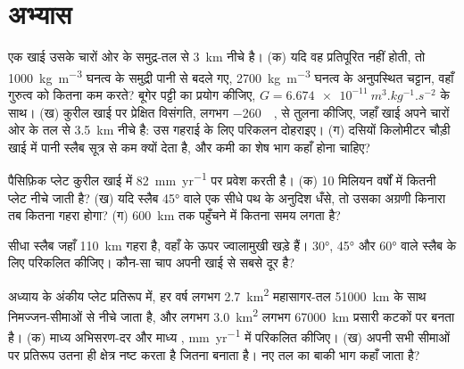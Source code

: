 \section{अभ्यास}

\begin{exercise}[$\star$]\label{exo:b1:active-margins:1}
एक खाई उसके चारों ओर के समुद्र-तल से \qty{3}{km} नीचे है। (क) यदि वह प्रतिपूरित नहीं होती, तो \qty{1000}{kg.m^{-3}} घनत्व के समुद्री पानी से बदले गए, \qty{2700}{kg.m^{-3}} घनत्व के अनुपस्थित चट्टान, वहाँ गुरुत्व को कितना कम करते? बूगेर पट्टी का प्रयोग कीजिए, $G = \qty{6.674e-11}{m^3.kg^{-1}.s^{-2}}$ के साथ। (ख) कुरील खाई पर प्रेक्षित विसंगति, लगभग \qty{-260}{\milli\gal}, से तुलना कीजिए, जहाँ खाई अपने चारों ओर के तल से \qty{3.5}{km} नीचे है: उस गहराई के लिए परिकलन दोहराइए। (ग) दसियों किलोमीटर चौड़ी खाई में पानी स्लैब सूत्र से कम क्यों देता है, और कमी का शेष भाग कहाँ होना चाहिए?
\end{exercise}

\begin{exercise}[$\star$]\label{exo:b1:active-margins:2}
पैसिफ़िक प्लेट कुरील खाई में \qty{82}{mm.yr^{-1}} पर प्रवेश करती है। (क) 10 मिलियन वर्षों में कितनी प्लेट नीचे जाती है? (ख) यदि स्लैब \ang{45}  वाले एक सीधे पथ के अनुदिश धँसे, तो उसका अग्रणी किनारा तब कितना गहरा होगा? (ग) \qty{600}{km} तक पहुँचने में कितना समय लगता है?
\end{exercise}

\begin{exercise}[$\star$]\label{exo:b1:active-margins:3}
सीधा स्लैब जहाँ \qty{110}{km} गहरा है, वहाँ के ऊपर ज्वालामुखी खड़े हैं। \ang{30}, \ang{45} और \ang{60}  वाले स्लैब के लिए  परिकलित कीजिए। कौन-सा चाप अपनी खाई से सबसे दूर है?
\end{exercise}

\begin{exercise}[$\star$]\label{exo:b1:active-margins:4}
अध्याय के अंकीय प्लेट प्रतिरूप में, हर वर्ष लगभग \qty{2.7}{km^2} महासागर-तल \qty{51000}{km} के साथ निमज्जन-सीमाओं से नीचे जाता है, और लगभग \qty{3.0}{km^2} लगभग \qty{67000}{km} प्रसारी कटकों पर बनता है। (क) माध्य अभिसरण-दर और माध्य , \unit{mm.yr^{-1}} में परिकलित कीजिए। (ख) अपनी सभी सीमाओं पर प्रतिरूप उतना ही क्षेत्र नष्ट करता है जितना बनाता है। नए तल का बाकी भाग कहाँ जाता है?
\end{exercise}

